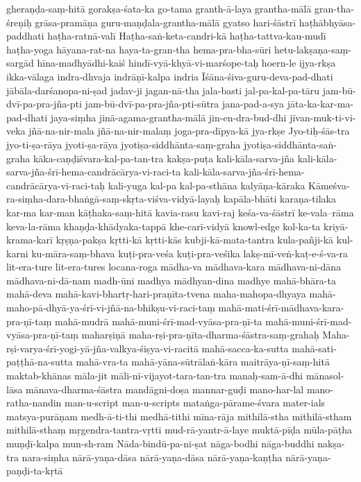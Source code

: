{gheraṇḍa-saṃ-hitā
gorakṣa-śata-ka
go-tama
granth-ā-laya
grantha-mālā
gran-tha-śreṇiḥ
grāsa-pramāṇa
guru-maṇḍala-grantha-mālā
gyatso
hari-śāstrī
haṭhābhyāsa-paddhati
haṭha-ratnā-valī
Haṭha-saṅ-keta-candri-kā
haṭha-tattva-kau-mudī
haṭha-yoga
hāyana-rat-na
haya-ta-gran-tha
hema-pra-bha-sūri
hetu-lakṣaṇa-saṃ-sargād
hīna-madhyādhi-kaiś
hindī-vyā-khyā-vi-marśope-taḥ
hoern-le
ijya-rkṣa
ikka-vālaga
indra-dhvaja
indrāṇī-kalpa
indria
Īśāna-śiva-guru-deva-pad-dhati
jābāla-darśanopa-ni-ṣad
jadav-ji
jagan-nā-tha
jala-basti
jal-pa-kal-pa-tāru
jam-bū-dvī-pa-pra-jña-pti
jam-bū-dvī-pa-pra-jña-pti-sūtra
jana-pad-a-sya
jāta-ka-kar-ma-pad-dhati
jaya-siṃha
jinā-agama-grantha-mālā
jin-en-dra-bud-dhi
jīvan-muk-ti-vi-veka
jñā-na-nir-mala
jñā-na-nir-malaṃ
joga-pra-dīpya-kā
jya-rkṣe
Jyo-tiḥ-śās-tra
jyo-ti-ṣa-rāya
jyoti-ṣa-rāya
jyotiṣa-siddhānta-saṃ-graha
jyotiṣa-siddhānta-saṅ-graha
kāka-caṇḍīśvara-kal-pa-tan-tra
kakṣa-puṭa
kali-kāla-sarva-jña
kali-kāla-sarva-jña-śrī-hema-candrācārya-vi-raci-ta
kali-kāla-sarva-jña-śrī-hema-candrācārya-vi-raci-taḥ
kali-yuga
kal-pa
kal-pa-sthāna
kalyāṇa-kāraka
Kāmeśva-ra-siṃha-dara-bhaṅgā-saṃ-skṛta-viśva-vidyā-layaḥ
kapāla-bhāti
karaṇa-tilaka
kar-ma
kar-man
kāṭhaka-saṃ-hitā
kavia-rasu
kavi-raj
keśa-va-śāstrī
ke-vala--rāma
keva-la-rāma
khaṇḍa-khādyaka-tappā
khe-carī-vidyā
knowl-edge
kol-ka-ta
kriyā-krama-karī
kṛṣṇa-pakṣa
kṛtti-kā
kṛtti-kās
kubji-kā-mata-tantra
kula-pañji-kā
kul-karni
ku-māra-saṃ-bhava
kuṭi-pra-veśa
kuṭi-pra-veśika
lakṣ-mī-veṅ-kaṭ-e-ś-va-ra
lit-era-ture
lit-era-tures
locana-roga
mādha-va
mādhava-kara
mādhava-ni-dāna
mādhava-ni-dā-nam
madh-ūni
madhya
mādhyan-dina
madhye
mahā-bhāra-ta
mahā-deva
mahā-kavi-bhartṛ-hari-praṇīta-tvena
maha-mahopa-dhyaya
mahā-maho-pā-dhyā-ya-śrī-vi-jñā-na-bhikṣu-vi-raci-taṃ
mahā-mati-śrī-mādhava-kara-pra-ṇī-taṃ
mahā-mudrā
mahā-muni-śrī-mad-vyāsa-pra-ṇī-ta
mahā-muni-śrī-mad-vyāsa-pra-ṇī-taṃ
maharṣiṇā
maha-rṣi-pra-ṇīta-dharma-śāstra-saṃ-grahaḥ
Maha-rṣi-varya-śrī-yogi-yā-jña-valkya-śiṣya-vi-racitā
mahā-sacca-ka-sutta
mahā-sati-paṭṭhā-na-sutta
mahā-vra-ta
mahā-yāna-sūtrālaṅ-kāra
maitrāya-ṇī-saṃ-hitā
maktab-khānas
māla-jit
māli-nī-vijayot-tara-tan-tra
manaḥ-sam-ā-dhi
mānasol-lāsa
mānava-dharma-śāstra
mandāgni-doṣa
mannar-guḍi
mano-har-lal
mano-ratha-nandin
man-u-script
man-u-scripts
mataṅga-pārame-śvara
mater-ials
matsya-purāṇam
medh-ā-ti-thi
medhā-tithi
mīna-rāja
mithilā-stha
mithilā-stham
mithilā-sthaṃ
mṛgendra-tantra-vṛtti
mud-rā-yantr-ā-laye
muktā-pīḍa
mūla-pāṭha
muṇḍī-kalpa
mun-sh-ram
Nāda-bindū-pa-ni-ṣat
nāga-bodhi
nāga-buddhi
nakṣa-tra
nara-siṃha
nārā-yaṇa-dāsa
nārā-yaṇa-dāsa
nārā-yaṇa-kaṇṭha
nārā-yaṇa-paṇḍi-ta-kṛtā
}
